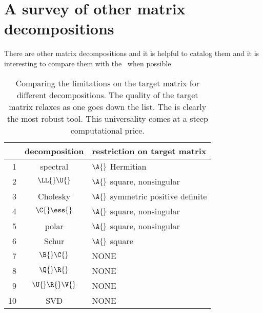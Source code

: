 \chapter[Other matrix decompositions]{A survey of other matrix decompositions}

There are other matrix decompositions and it is helpful to catalog them and it is interesting to compare them with the \svdl \ when possible.

\begin{table}[htdp]
\begin{center}
\begin{tabular}{rcl}
 & decomposition & restriction on target matrix \\\hline
 1 & spectral & $\A{}$ Hermitian \\
 2 & $\LL{}\U{}$ & $\A{}$ square, nonsingular \\
 3 & Cholesky & $\A{}$ symmetric positive definite \\
 4 & $\C{}\ess{}$ & $\A{}$ square, nonsingular \\
 5 & polar & $\A{}$ square, nonsingular \\
 6 & Schur & $\A{}$ square \\
 7 & $\B{}\C{}$ & NONE \\
 8 & $\Q{}\R{}$ & NONE \\
 9 & $\U{}\R{}\V{}$ & NONE \\
10 & SVD & NONE
\end{tabular}
\end{center}
\label{tab:decomp:compare}
\caption[Comparing the limitations for different matrix decompositions]{Comparing the limitations on the target matrix for different decompositions. The quality of the target matrix relaxes as one goes down the list. The \svdl is clearly the most robust tool. This universality comes at a steep computational price.}
\end{table}%











\endinput